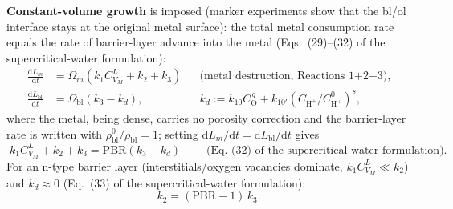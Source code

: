 \textbf{Constant-volume growth} is imposed (marker experiments show that the
bl/ol interface stays at the original metal surface): the total metal
consumption rate equals the rate of barrier-layer advance into the metal
(Eqs.~(29)--(32) of the supercritical-water formulation):
\begin{align}
\frac{\mathrm{d}L_m}{\mathrm{d}t} &= \Omega_m \left( k_1 C_{V_M}^{L} + k_2 + k_3 \right)
&&\text{(metal destruction, Reactions 1+2+3)} , \\
\frac{\mathrm{d}L_{\mathrm{bl}}}{\mathrm{d}t} &= \Omega_{\mathrm{bl}} \left( k_3 - k_d \right) ,
&&k_d := k_{10} C_{\mathrm{O}}^{\,q}
+ k_{10'} \left( C_{\mathrm{H^+}}/C^0_{\mathrm{H^+}} \right)^{s} ,
\end{align}
where the metal, being dense, carries no porosity correction and the
barrier-layer rate is written with $\rho^0_{\mathrm{bl}}/\rho_{\mathrm{bl}}
= 1$; setting $\mathrm{d}L_m/\mathrm{d}t = \mathrm{d}L_{\mathrm{bl}}/\mathrm{d}t$
gives
\begin{equation}
\boxed{\;
k_1 C_{V_M}^{L} + k_2 + k_3 = \mathrm{PBR} \left( k_3 - k_d \right)
\;}
\qquad
\text{(Eq.~(32) of the supercritical-water formulation)} .
\label{eq:cv}
\end{equation}
For an n-type barrier layer (interstitials/oxygen vacancies dominate,
$k_1 C_{V_M}^{L} \ll k_2$) and $k_d \approx 0$
(Eq.~(33) of the supercritical-water formulation):
\begin{equation}
k_2 = (\mathrm{PBR} - 1)\, k_3 .
\end{equation}

